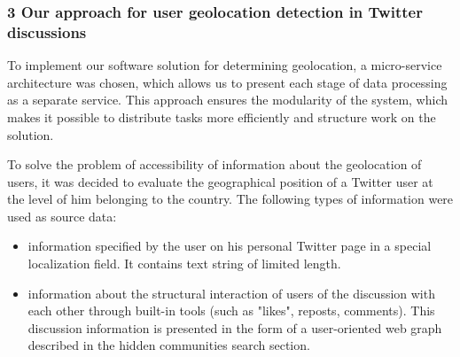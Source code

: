 \subsubsection{3 Our approach for user geolocation detection in Twitter discussions}

To implement our software solution for determining geolocation, a micro-service architecture was chosen, which allows us to present each stage of data processing as a separate service. This approach ensures the modularity of the system, which makes it possible to distribute tasks more efficiently and structure work on the solution.

To solve the problem of accessibility of information about the geolocation of users, it was decided to evaluate the geographical position of a Twitter user at the level of him belonging to the country. The following types of information were used as source data:

\begin{itemize}
	\item information specified by the user on his personal Twitter page in a special localization field. It contains text string of limited length.
	\item information about the structural interaction of users of the discussion with each other through built-in tools (such as "likes", reposts, comments). This discussion information is presented in the form of a user-oriented web graph described in the hidden communities search section.
\end{itemize}

